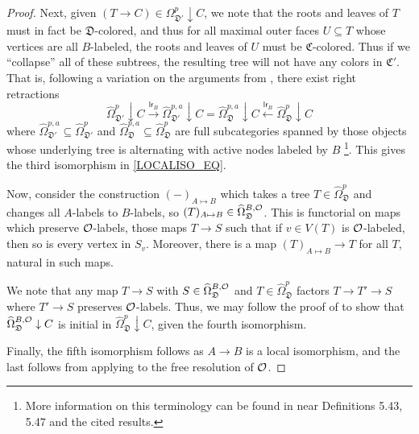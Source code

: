 \documentclass[a4paper,10pt
,draft
]{article}%
\renewcommand{\hat}{\widehat}
\renewcommand{\1}{\eta}%
\begin{document}
\begin{proof}
      Next, given $(T \to C) \in \Omega_{\mathfrak D'}^p \downarrow C$, we note that the roots and leaves of $T$ must in fact be $\mathfrak D$-colored,
      and thus for all maximal outer faces $U \subseteq T$ whose vertices are all $B$-labeled,
      the roots and leaves of $U$ must be $\mathfrak C$-colored.
      Thus if we ``collapse'' all of these subtrees, the resulting tree will not have any colors in $\mathfrak C'$.
      That is, following a variation on the arguments from \cite[Prop. 5.48, Cor. 5.52]{BP_geo},
      there exist right retractions
      \[
            \hat \Omega_{\mathfrak D'}^{p} \downarrow C \xrightarrow{\mathsf{lr}_B}
            \hat \Omega_{\mathfrak D'}^{p,a} \downarrow C 
            =
            \hat \Omega_{\mathfrak D}^{p,a} \downarrow C \xleftarrow{\mathsf{lr}_B}
            \hat \Omega_{\mathfrak D}^{p} \downarrow C 
      \]
      where $\hat \Omega_{\mathfrak D'}^{p,a} \subseteq \hat \Omega_{\mathfrak D'}^{p}$
      and $\hat \Omega_{\mathfrak D}^{p,a} \subseteq \hat \Omega_{\mathfrak D}^{p}$
      are full subcategories spanned by those objects whose underlying tree is alternating with active nodes labeled by $B$ \footnote{
        More information on this terminology can be found in \cite{BP_geo} near
        Definitions 5.43, 5.47 and the cited results.}.
      This gives the third isomorphism in \eqref{LOCALISO_EQ}.

      Now, consider the construction $(-)_{A \mapsto B}$ which takes a tree $T \in \hat\Omega_{\mathfrak D}^{p}$
      and changes all $A$-labels to $B$-labels, so $(T)_{A \mapsto B} \in \hat\Omega_{\mathfrak D}^{B,\O}$.
      This is functorial on maps which preserve $\mathcal{O}$-labels,
      those maps $T \to S$ such that if $v \in V(T)$ is $\mathcal{O}$-labeled, then so is every vertex in $S_v$.
      Moreover, there is a map $(T)_{A \mapsto B} \to T$ for all $T$, natural in such maps.

      We note that any map $T \to S$ with $S \in \hat \Omega_{\mathfrak D}^{B,\O}$ and $T \in \hat\Omega_{\mathfrak D}^p$ factors $T \to T' \to S$ where $T' \to S$ preserves $\mathcal{O}$-labels.
      Thus, we may follow the proof of \cite[Lemma 5.57]{BP_geo} to show that
      $\hat\Omega_{\mathfrak D}^{B,\O} \downarrow C$ is initial in $\hat\Omega_{\mathfrak D}^p \downarrow C$, given the fourth isomorphism.
      
      Finally, the fifth isomorphism follows as $A \to B$ is a local isomorphism,
      and the last follows from applying \cite[Prop 5.37]{BP_geo} to the free resolution of $\mathcal{O}$.      
\end{proof}
\end{document}
